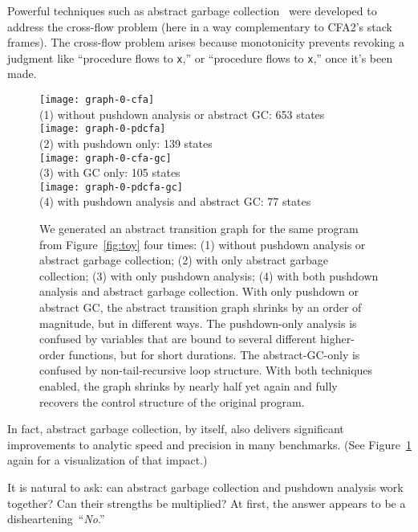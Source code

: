 Powerful techniques such as abstract garbage collection~\cite{mattmight:Might:2006:GammaCFA}
were developed to address the cross-flow problem (here in a way complementary to CFA2's stack frames).
The cross-flow problem arises because monotonicity prevents revoking a
judgment like ``procedure  flows to {\tt x},'' or ``procedure
 flows to {\tt x},'' once it's been made.

\begin{figure}
\begin{center}
\texttt{[image: graph-0-cfa]}
\\
(1) without pushdown analysis or abstract GC: 653 states
\\
\texttt{[image: graph-0-pdcfa]}
\\
(2) with pushdown only: 139 states
\\
\texttt{[image: graph-0-cfa-gc]}
\\
(3) with GC only: 105 states
\\
\texttt{[image: graph-0-pdcfa-gc]}
\\
(4) with pushdown analysis and abstract GC: 77 states
\end{center}

\caption{
We generated an abstract transition graph
for the same program from Figure~\ref{fig:toy} four times: 
 (1) without pushdown analysis or abstract garbage collection;
 (2) with only abstract garbage collection;
 (3) with only pushdown analysis;
 (4) with both pushdown analysis and abstract garbage collection.
With only pushdown or abstract GC, the abstract transition graph shrinks
by an order of magnitude, but in different ways.
The pushdown-only analysis is confused by variables 
that are bound to several different higher-order functions,
but for short durations.
The abstract-GC-only is confused by non-tail-recursive loop structure.
With both techniques enabled, the graph shrinks by nearly half yet again
and fully recovers the control structure of the original program.}
\label{fig:diamond}
\end{figure}


In fact, abstract garbage collection, by itself, also delivers significant
improvements to analytic speed and precision in many benchmarks.
(See Figure~\ref{fig:diamond} again for a visualization of that
impact.)


It is natural to ask: can abstract garbage collection and pushdown 
analysis work together?
Can their strengths be multiplied?
At first, the answer appears to be a disheartening~``\emph{No}.''




